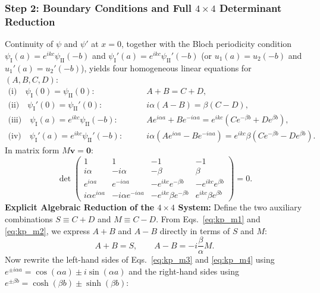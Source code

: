 \documentclass[11pt,a4paper]{article}
\newcommand{\vb}[1]{\mathbf{#1}}
\begin{document}
\subsubsection{Step 2: Boundary Conditions and Full \texorpdfstring{$4\times 4$}{4x4} Determinant Reduction}
Continuity of $\psi$ and $\psi'$ at $x=0$, together with the Bloch periodicity condition $\psi_{\mathrm{I}}(a) = e^{ikc}\psi_{\mathrm{II}}(-b)$ and $\psi_{\mathrm{I}}'(a) = e^{ikc}\psi_{\mathrm{II}}'(-b)$ (or $u_1(a)=u_2(-b)$ and $u_1'(a)=u_2'(-b)$), yields four homogeneous linear equations for $(A, B, C, D)$:
\begin{align}
    \text{(i)}\quad \psi_{\mathrm{I}}(0) = \psi_{\mathrm{II}}(0): \qquad & A + B = C + D, \label{eq:kp_m1}\\
    \text{(ii)}\quad \psi_{\mathrm{I}}'(0) = \psi_{\mathrm{II}}'(0): \qquad & i\alpha(A - B) = \beta(C - D), \label{eq:kp_m2}\\
    \text{(iii)}\quad \psi_{\mathrm{I}}(a) = e^{ikc}\psi_{\mathrm{II}}(-b): \qquad & A e^{i\alpha a} + B e^{-i\alpha a} = e^{ikc}\left(C e^{-\beta b} + D e^{\beta b}\right), \label{eq:kp_m3}\\
    \text{(iv)}\quad \psi_{\mathrm{I}}'(a) = e^{ikc}\psi_{\mathrm{II}}'(-b): \qquad & i\alpha\left(A e^{i\alpha a} - B e^{-i\alpha a}\right) = e^{ikc}\beta\left(C e^{-\beta b} - D e^{\beta b}\right). \label{eq:kp_m4}
\end{align}
In matrix form $M\vb{v} = \vb{0}$:
\begin{equation}
    \det \begin{pmatrix}
        1 & 1 & -1 & -1 \\
        i\alpha & -i\alpha & -\beta & \beta \\
        e^{i\alpha a} & e^{-i\alpha a} & -e^{ikc}e^{-\beta b} & -e^{ikc}e^{\beta b} \\
        i\alpha e^{i\alpha a} & -i\alpha e^{-i\alpha a} & -e^{ikc}\beta e^{-\beta b} & e^{ikc}\beta e^{\beta b}
    \end{pmatrix} = 0.
\end{equation}
\textbf{Explicit Algebraic Reduction of the $4\times 4$ System:}
Define the two auxiliary combinations $S \equiv C + D$ and $M \equiv C - D$. From Eqs.~\eqref{eq:kp_m1} and \eqref{eq:kp_m2}, we express $A+B$ and $A-B$ directly in terms of $S$ and $M$:
\begin{equation}
    A + B = S, \qquad A - B = -i\frac{\beta}{\alpha}M.
\end{equation}
Now rewrite the left-hand sides of Eqs.~\eqref{eq:kp_m3} and \eqref{eq:kp_m4} using $e^{\pm i\alpha a} = \cos(\alpha a) \pm i\sin(\alpha a)$ and the right-hand sides using $e^{\pm\beta b} = \cosh(\beta b) \pm \sinh(\beta b)$:
\end{document}
